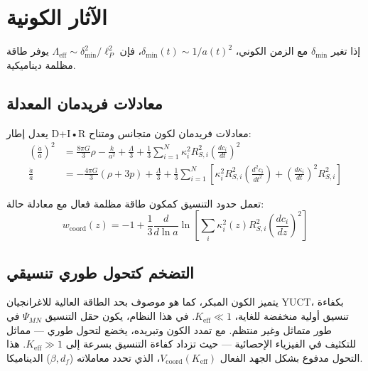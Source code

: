 \documentclass[11pt,a4paper]{article}
\begin{document}
	\section{الآثار الكونية}
	
	إذا تغير $\delta_{\min}$ مع الزمن الكوني، $\delta_{\min}(t) \sim 1/a(t)^2$، فإن $\Lambda_{\text{eff}} \sim \delta_{\min}^2/\ell_P^2$ يوفر طاقة مظلمة ديناميكية.
	
	\subsection{معادلات فريدمان المعدلة}
	
	يعدل إطار D+I•R معادلات فريدمان لكون متجانس ومتناح:
	\begin{align}
		\left(\frac{\dot{a}}{a}\right)^2 &= \frac{8\pi G}{3}\rho - \frac{k}{a^2} + \frac{\Lambda}{3} + \frac{1}{3}\sum_{i=1}^N \kappa_i^2 R_{S,i}^2 \left(\frac{dc_i}{dt}\right)^2 \\
		\frac{\ddot{a}}{a} &= -\frac{4\pi G}{3}(\rho + 3p) + \frac{\Lambda}{3} + \frac{1}{3}\sum_{i=1}^N \left[ \kappa_i^2 R_{S,i}^2 \left(\frac{d^2c_i}{dt^2}\right) + \left(\frac{d\kappa_i}{dt}\right)^2 R_{S,i}^2 \right]
	\end{align}
	
	تعمل حدود التنسيق كمكون طاقة مظلمة فعال مع معادلة حالة:
	\begin{equation}
		w_{\text{coord}}(z) = -1 + \frac{1}{3} \frac{d}{d\ln a} \ln \left[ \sum_i \kappa_i^2(z) R_{S,i}^2 \left(\frac{dc_i}{dz}\right)^2 \right]
	\end{equation}
	
	\subsection{التضخم كتحول طوري تنسيقي}
	\label{subsec:inflation-transition}
	
	يتميز الكون المبكر، كما هو موصوف بحد الطاقة العالية للاغرانجيان YUCT، بكفاءة تنسيق أولية منخفضة للغاية، $K_{\mathrm{eff}} \ll 1$. في هذا النظام، يكون حقل التنسيق $\Psi_{MN}$ في طور متماثل وغير منتظم. مع تمدد الكون وتبريده، يخضع لتحول طوري — مماثل للتكثيف في الفيزياء الإحصائية — حيث تزداد كفاءة التنسيق بسرعة إلى $K_{\mathrm{eff}} \gg 1$. هذا التحول مدفوع بشكل الجهد الفعال $V_{\mathrm{coord}}(K_{\mathrm{eff}})$، الذي تحدد معاملاته ($\beta, d_f$) الديناميكا.
	
\end{document}

